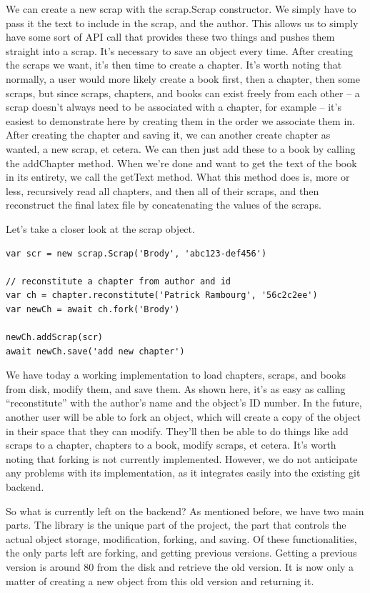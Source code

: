 \documentclass[onecolumn, draftclsnofoot,10pt, compsoc]{IEEEtran}
\begin{document}
We can create a new scrap with the scrap.Scrap constructor. We simply have
to pass it the text to include in the scrap, and the author. This allows us to
simply have some sort of API call that provides these two things and pushes them
straight into a scrap. It’s necessary to save an object every time. After
creating the scraps we want, it’s then time to create a chapter. It’s worth
noting that normally, a user would more likely create a book first, then a
chapter, then some scraps, but since scraps, chapters, and books can exist
freely from each other -- a scrap doesn’t always need to be associated with a
chapter, for example -- it’s easiest to demonstrate here by creating them in the
order we associate them in. After creating the chapter and saving it, we can
another create chapter as wanted, a new scrap, et cetera. We can then
just add these to a book by calling the addChapter method. When we’re done and
want to get the text of the book in its entirety, we call the getText method.
What this method does is, more or less, recursively read all chapters, and then
all of their scraps, and then reconstruct the final latex file by concatenating
the values of the scraps.

Let’s take a closer look at the scrap object.

\begin{verbatim}
var scr = new scrap.Scrap('Brody', 'abc123-def456')

// reconstitute a chapter from author and id
var ch = chapter.reconstitute('Patrick Rambourg', '56c2c2ee')
var newCh = await ch.fork('Brody')

newCh.addScrap(scr)
await newCh.save('add new chapter')
\end{verbatim}

We have today a working
implementation to load chapters, scraps, and books from disk, modify them, and
save them. As shown here, it’s as easy as calling “reconstitute” with the
author’s name and the object’s ID number. In the future, another user will be
able to fork an object, which will create a copy of the object in their space
that they can modify. They’ll then be able to do things like add scraps to a
chapter, chapters to a book, modify scraps, et cetera. It’s worth noting that
forking is not currently implemented. However, we do not anticipate any problems
with its implementation, as it integrates easily into the existing git backend.

So what is currently left on the backend? As mentioned before, we have two main
parts. The library is the unique part of the project, the part that controls
the actual object storage, modification, forking, and saving. Of these
functionalities, the only parts left are forking, and getting previous versions.
Getting a previous version is around 80%
from the disk and retrieve the old version. It is now only a matter of creating
a new object from this old version and returning it.
\end{document}
